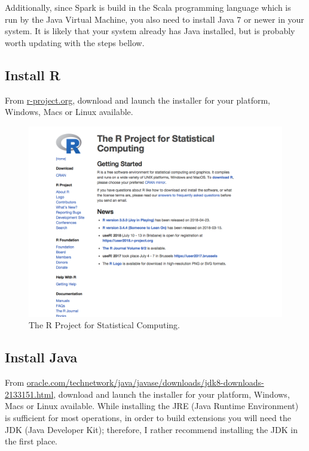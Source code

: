 \documentclass[]{book}
\theoremstyle{definition}
\theoremstyle{definition}
\theoremstyle{definition}
\theoremstyle{remark}
\begin{document}
Additionally, since Spark is build in the Scala programming language
which is run by the Java Virtual Machine, you also need to install Java
7 or newer in your system. It is likely that your system already has
Java installed, but is probably worth updating with the steps bellow.

\hypertarget{install-r}{%
\subsection{Install R}\label{install-r}}

From \href{https://r-project.org/}{r-project.org}, download and launch
the installer for your platform, Windows, Macs or Linux available.

\begin{figure}

{\centering \includegraphics[width=13.78in]{images/02-getting-started-download-r} 

}

\caption{The R Project for Statistical Computing.}\label{fig:r-download}
\end{figure}

\hypertarget{install-java}{%
\subsection{Install Java}\label{install-java}}

From
\href{http://www.oracle.com/technetwork/java/javase/downloads/jdk8-downloads-2133151.html}{oracle.com/technetwork/java/javase/downloads/jdk8-downloads-2133151.html},
download and launch the installer for your platform, Windows, Macs or
Linux available. While installing the JRE (Java Runtime Environment) is
sufficient for most operations, in order to build extensions you will
need the JDK (Java Developer Kit); therefore, I rather recommend
installing the JDK in the first place.
\end{document}
